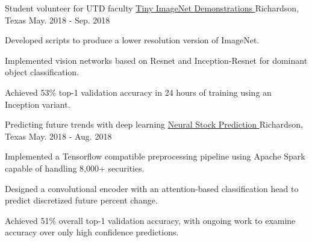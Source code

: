

\begin{cventries}

  \cventry
  	{Student volunteer for UTD faculty} %
		{
			\href{https://github.com/TidalPaladin/tiny-imagenet-demo}
			{Tiny ImageNet Demonstrations \faGithubSquare}
		} %
    {Richardson, Texas} %
  	{May. 2018 - Sep. 2018} %
	{
	\begin{cvitems}
		\item {
				Developed scripts to produce a lower resolution version of
				ImageNet.
		}
		\item {
				Implemented vision networks based on Resnet and
				Inception-Resnet for dominant object classification.
		}
		\item {
				Achieved 53\% top-1 validation accuracy in 24 hours of
				training using an Inception variant.
		}
	\end{cvitems}
	}

  \cventry
  	{Predicting future trends with deep learning} %
		{
			\href{https://github.com/TidalPaladin/trader}
			{Neural Stock Prediction \faGithubSquare}
		} %
    {Richardson, Texas} %
  	{May. 2018 - Aug. 2018} %
	{
	\begin{cvitems}
		\item {
				Implemented a Tensorflow compatible preprocessing pipeline using
				Apache Spark capable of handling 8,000+ securities.
		}
		\item {
				Designed a convolutional encoder with an attention-based
				classification head to predict discretized future percent
				change.
		}
		\item {
				Achieved 51\% overall top-1 validation accuracy, with ongoing work to
				examine accuracy over only high confidence predictions.
		}
	\end{cvitems}
	}


\end{cventries}
